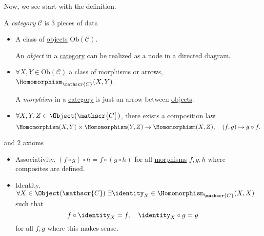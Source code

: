 Now, we see start with the definition.
\begin{definition}[Category]\label{def:category}
	A \emph{category} \(\mathscr{C} \) is \(3\) pieces of data
	\begin{itemize}
		\item A class of \hyperref[def:object]{objects} \(\mathrm{Ob}(\mathscr{C})\).
		      \begin{definition}[Object]\label{def:object}
			      An \emph{object} in a \hyperref[def:category]{category} can be realized as a node in a directed diagram.
		      \end{definition}
		\item \(\forall X, Y\in\mathrm{Ob} (\mathscr{C})\) a class of \hyperref[def:morphism]{morphisms} or \underline{arrows},
		      \(\Homomorphism_{\mathscr{C}}(X, Y)\).
		      \begin{definition}[Morphism]\label{def:morphism}
			      A \emph{morphism} in a \hyperref[def:category]{category} is just an arrow between \hyperref[def:object]{objects}.
		      \end{definition}
		\item \(\forall X, Y, Z\in \Object (\mathscr{C})\), there exists a composition law
		      \[
			      \Homomorphism (X, Y)\times \Homomorphism (Y, Z)\to \Homomorphism (X, Z),\quad (f, g)\mapsto g\circ f.
		      \]
	\end{itemize}
	and \(2\) axioms
	\begin{itemize}
		\item Associativity. \((f\circ g)\circ h = f\circ (g\circ h)\) for all \hyperref[def:morphism]{morphisms} \(f, g, h\)
		      where composites are defined.
		\item Identity. \(\forall X\in\Object (\mathscr{C})\ \exists \identity_{X}\in\Homomorphism _{\mathscr{C}} (X, X)\) such that
		      \[
			      f\circ \identity_{X} = f,\quad \identity_{X} \circ g = g
		      \]
		      for all \(f, g\) where this makes sense.
	\end{itemize}
\end{definition}

